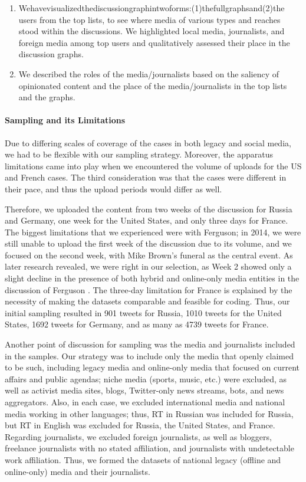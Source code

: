 \begin{enumerate}
	\item Wehavevisualizedthediscussiongraphintwoforms:(1)thefullgraphsand(2)the users from the top lists, to see where media of various types and reaches stood within the discussions. We highlighted local media, journalists, and foreign media among top users and qualitatively assessed their place in the discussion graphs.
	
	\item We described the roles of the media/journalists based on the saliency of opinionated content and the place of the media/journalists in the top lists and the graphs.
\end{enumerate}

\paragraph{Sampling and its Limitations}

Due to differing scales of coverage of the cases in both legacy and social media, we had to be flexible with our sampling strategy. Moreover, the apparatus limitations came into play when we encountered the volume of uploads for the US and French cases. The third consideration was that the cases were different in their pace, and thus the upload periods would differ as well.

Therefore, we uploaded the content from two weeks of the discussion for Russia and Germany, one week for the United States, and only three days for France. The biggest limitations that we experienced were with Ferguson; in 2014, we were still unable to upload the first week of the discussion due to its volume, and we focused on the second week, with Mike Brown’s funeral as the central event. As later research revealed, we were right in our selection, as Week 2 showed only a slight decline in the presence of both hybrid and online-only media entities in the discussion of Ferguson \cite{GroshekTandoc}. The three-day limitation for France is explained by the necessity of making the datasets comparable and feasible for coding. Thus, our initial sampling resulted in 901 tweets for Russia, 1010 tweets for the United States, 1692 tweets for Germany, and as many as 4739 tweets for France.

Another point of discussion for sampling was the media and journalists included in the samples. Our strategy was to include only the media that openly claimed to be such, including legacy media and online-only media that focused on current affairs and public agendas; niche media (sports, music, etc.) were excluded, as well as activist media sites, blogs, Twitter-only news streams, bots, and news aggregators. Also, in each case, we excluded international media and national media working in other languages; thus, RT in Russian was included for Russia, but RT in English was excluded for Russia, the United States, and France. Regarding journalists, we excluded foreign journalists, as well as bloggers, freelance journalists with no stated affiliation, and journalists with undetectable work affiliation. Thus, we formed the datasets of national legacy (offline and online-only) media and their journalists.

